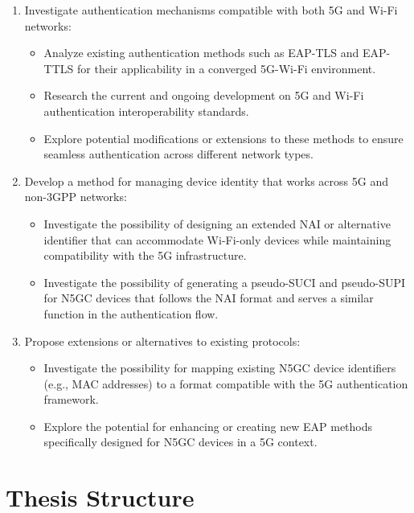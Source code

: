 \begin{enumerate}
    \item{
        Investigate authentication mechanisms compatible with both \ac{5G} and Wi-Fi networks:
        \begin{itemize}
            \item {
                Analyze existing authentication methods such as \ac{EAP-TLS} and \ac{EAP-TTLS} for their applicability in a converged \ac{5G}-Wi-Fi environment.
            }
            \item {
                Research the current and ongoing development on 5G and Wi-Fi authentication interoperability standards.
            }
            \item {
                Explore potential modifications or extensions to these methods to ensure seamless authentication across different network types.
            }
        \end{itemize}
    }
    \item{
        Develop a method for managing device identity that works across \ac{5G} and non-\ac{3GPP} networks:
        \begin{itemize}
            \item Investigate the possibility of designing an extended \ac{NAI} or alternative identifier that can accommodate Wi-Fi-only devices while maintaining compatibility with the \ac{5G} infrastructure.
            \item Investigate the possibility of generating a pseudo-\ac{SUCI} and pseudo-\ac{SUPI} for \ac{N5GC} devices that follows the \ac{NAI} format and serves a similar function in the authentication flow.
        \end{itemize}
    }
    \item{
        Propose extensions or alternatives to existing protocols:
        \begin{itemize}
            \item Investigate the possibility for mapping existing \ac{N5GC} device identifiers (e.g., \ac{MAC} addresses) to a format compatible with the \ac{5G} authentication framework.
            \item Explore the potential for enhancing or creating new \ac{EAP} methods specifically designed for \ac{N5GC} devices in a \ac{5G} context.
        \end{itemize}
    }
\end{enumerate}

\section{Thesis Structure}

